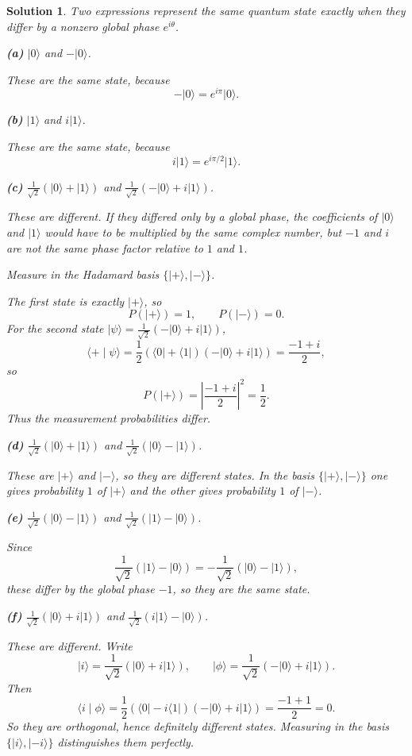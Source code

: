 \documentclass[11pt,a4paper]{article}
\theoremstyle{sol}
\newtheorem*{solution}{Solution}
\newcommand{\ket}[1]{\lvert #1\rangle}
\newcommand{\bra}[1]{\langle #1\rvert}
\newcommand{\braket}[2]{\langle #1 \mid #2\rangle}
\begin{document}
\begin{solution}
Two expressions represent the same quantum state exactly when they differ by a nonzero global phase $e^{i\theta}$.

\textbf{(a)} $\ket{0}$ and $-\ket{0}$.

These are the same state, because
\[
-\ket{0}=e^{i\pi}\ket{0}.
\]

\textbf{(b)} $\ket{1}$ and $i\ket{1}$.

These are the same state, because
\[
i\ket{1}=e^{i\pi/2}\ket{1}.
\]

\textbf{(c)} $\frac{1}{\sqrt2}(\ket{0}+\ket{1})$ and $\frac{1}{\sqrt2}(-\ket{0}+i\ket{1})$.

These are \emph{different}. If they differed only by a global phase, the coefficients of $\ket{0}$ and $\ket{1}$ would have to be multiplied by the same complex number, but $-1$ and $i$ are not the same phase factor relative to $1$ and $1$.

Measure in the Hadamard basis $\{\ket{+},\ket{-}\}$.

The first state is exactly $\ket{+}$, so
\[
P(\ket{+})=1,\qquad P(\ket{-})=0.
\]
For the second state $\ket{\psi}=\frac{1}{\sqrt2}(-\ket{0}+i\ket{1})$,
\[
\braket{+}{\psi}
=\frac{1}{2}(\bra{0}+\bra{1})(-\ket{0}+i\ket{1})
=\frac{-1+i}{2},
\]
so
\[
P(\ket{+})=\left|\frac{-1+i}{2}\right|^2=\frac12.
\]
Thus the measurement probabilities differ.

\textbf{(d)} $\frac{1}{\sqrt2}(\ket{0}+\ket{1})$ and $\frac{1}{\sqrt2}(\ket{0}-\ket{1})$.

These are $\ket{+}$ and $\ket{-}$, so they are different states. In the basis $\{\ket{+},\ket{-}\}$ one gives probability $1$ of $\ket{+}$ and the other gives probability $1$ of $\ket{-}$.

\textbf{(e)} $\frac{1}{\sqrt2}(\ket{0}-\ket{1})$ and $\frac{1}{\sqrt2}(\ket{1}-\ket{0})$.

Since
\[
\frac{1}{\sqrt2}(\ket{1}-\ket{0})
=-\frac{1}{\sqrt2}(\ket{0}-\ket{1}),
\]
these differ by the global phase $-1$, so they are the same state.

\textbf{(f)} $\frac{1}{\sqrt2}(\ket{0}+i\ket{1})$ and $\frac{1}{\sqrt2}(i\ket{1}-\ket{0})$.

These are different. Write
\[
\ket{i}=\frac{1}{\sqrt2}(\ket{0}+i\ket{1}),
\qquad
\ket{\phi}=\frac{1}{\sqrt2}(-\ket{0}+i\ket{1}).
\]
Then
\[
\braket{i}{\phi}
=\frac{1}{2}(\bra{0}-i\bra{1})(-\ket{0}+i\ket{1})
=\frac{-1+1}{2}=0.
\]
So they are orthogonal, hence definitely different states. Measuring in the basis $\{\ket{i},\ket{-i}\}$ distinguishes them perfectly.


\end{solution}
\end{document}
